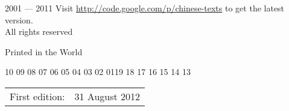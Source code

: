 \documentclass[10pt,letterpaper,extrafontsizes]{memoir}
\newcommand{\doccopyright}{Visit \url{http://code.google.com/p/chinese-texts} to get the latest version.}
\newif\ifMASTER
\begin{document}
\begingroup
\footnotesize
\setlength{\parindent}{0pt}
\setlength{\parskip}{\baselineskip}
\textcopyright{} 2001 --- 2011 \doccopyright \\
All rights reserved


Printed in the World 

\vfil

\begin{center}
10 09 08 07 06 05 04 03 02 01\hspace{2em}19 18 17 16 15 14 13
\end{center}
\begin{center}
\begin{tabular}{ll}
First edition:                        & 31 August 2012 \\
\end{tabular}
\end{center}
\ifMASTER
Manual last changed \svnyear/\svnmonth/\svnday
\fi

\endgroup
\clearpage


\vspace*{\fill}
\end{document}
